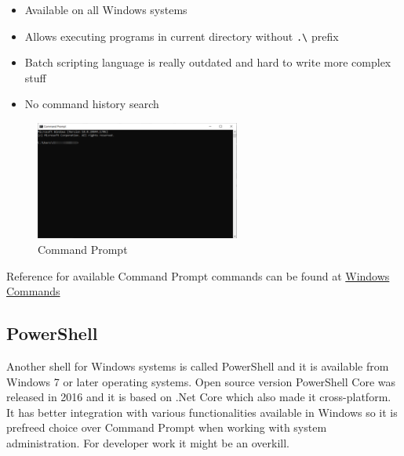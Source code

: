 \documentclass[lang=en,color=green]{elegantbook}
\begin{document}
\noindent\begin{minipage}[t]{0.5\textwidth}%
    \begin{itemize}[leftmargin=*]
        \item Available on all Windows systems
        \item Allows executing programs in current directory without  \lstinline{.\}  prefix
    \end{itemize}
\end{minipage}%
\begin{minipage}[t]{0.5\textwidth}%
    \begin{itemize}[leftmargin=*]
        \item Batch scripting language is really outdated and hard to write more complex stuff
        \item No command history search
    \end{itemize}
\end{minipage}%

\begin{figure}[htbp]
    \centering
    \includegraphics[width=0.6\textwidth]{images/command-prompt.png}
    \caption{Command Prompt\label{fig:Command Prompt}}
\end{figure}

Reference for available Command Prompt commands can be found at \href{https://docs.microsoft.com/en-us/windows-server/administration/windows-commands/windows-commands}{Windows Commands}

\subsection{PowerShell}
Another shell for Windows systems is called PowerShell and it is available from
Windows 7 or later operating systems. Open source version PowerShell Core was released in 2016 and
it is based on .Net Core which also made it cross-platform. It has better integration
with various functionalities available in Windows so it is prefreed choice over Command Prompt
when working with system administration. For developer work it might be an overkill.
\end{document}
